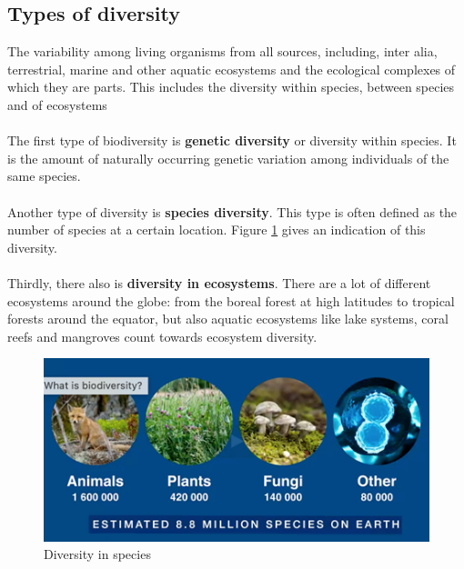 \documentclass[../summary.tex]{subfiles}
\begin{document}
	\subsection{Types of diversity}
	The variability among living organisms from all sources, including, inter alia, terrestrial, marine and other aquatic ecosystems and the ecological complexes of which they are parts. This includes the diversity within species, between species and of ecosystems
	\\
	\\
	The first type of biodiversity is \textbf{genetic diversity} or diversity within species. It is the amount of naturally occurring genetic variation among individuals of the same species. 
	\\
	\\
	Another type of diversity is \textbf{species diversity}. This type is often defined as the number of species at a certain location. Figure \ref{fig:diversity_species} gives an indication of this diversity.
	\\
	\\
	Thirdly, there also is \textbf{diversity in ecosystems}. There are a lot of different ecosystems around the globe: from the boreal forest at high latitudes to tropical forests around the equator, but also aquatic ecosystems like lake systems, coral reefs and mangroves count towards ecosystem diversity.
	\\
	\begin{figure}[htbp]
		\centering
		\includegraphics[width=0.75\linewidth]{images/2-diversity_species.png}
		\caption{Diversity in species}
		\label{fig:diversity_species}
	\end{figure}
	
\end{document}
